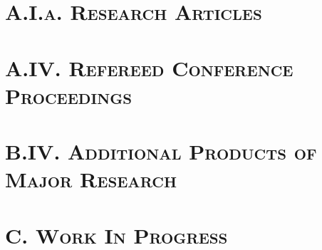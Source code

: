 \documentclass[11pt]{res}
\newcommand{\MarginText}[1]{\section{\textsc{#1}}\vspace{10pt}}
\begin{document}


\address{}
\address{}

\begin{resume}

\MarginText{A.I.a. Research Articles}
\nocite{*}
\vspace{10pt}
\printbibliography[heading=none]
\clearpage

\MarginText{A.IV. Refereed Conference Proceedings}
\nocite{*}
\vspace{10pt}
\printbibliography[heading=none]
\clearpage

\MarginText{B.IV. Additional Products of Major Research}
\nocite{*}
\vspace{10pt}
\printbibliography[heading=none]
\clearpage

\MarginText{C. Work In Progress}
\nocite{*}
\vspace{10pt}
\printbibliography[heading=none]
\clearpage

\end{resume}
\end{document}
